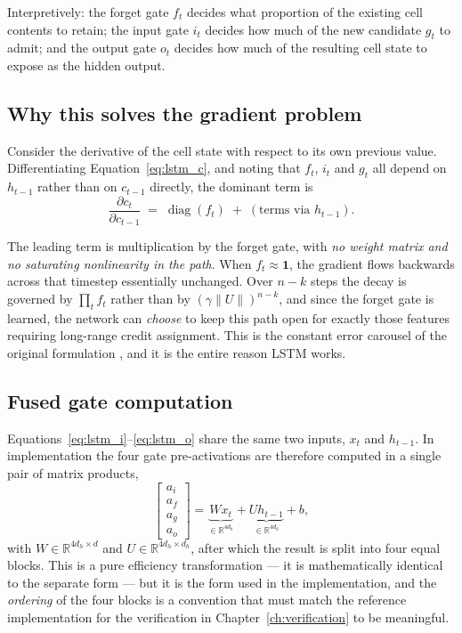 Interpretively: the forget gate $f_t$ decides what proportion of the existing cell contents to
retain; the input gate $i_t$ decides how much of the new candidate $g_t$ to admit; and the output
gate $o_t$ decides how much of the resulting cell state to expose as the hidden output.

\subsection{Why this solves the gradient problem}

Consider the derivative of the cell state with respect to its own previous value. Differentiating
Equation~\ref{eq:lstm_c}, and noting that $f_t$, $i_t$ and $g_t$ all depend on $h_{t-1}$ rather
than on $c_{t-1}$ directly, the dominant term is
\begin{equation}
\frac{\partial c_t}{\partial c_{t-1}} \;=\; \operatorname{diag}(f_t) \;+\; (\text{terms via } h_{t-1}).
\label{eq:lstm_grad}
\end{equation}

The leading term is multiplication by the forget gate, with \emph{no weight matrix and no
saturating nonlinearity in the path}. When $f_t \approx \mathbf{1}$, the gradient flows backwards
across that timestep essentially unchanged. Over $n-k$ steps the decay is governed by
$\prod_t f_t$ rather than by $(\gamma\|U\|)^{n-k}$, and since the forget gate is learned, the
network can \emph{choose} to keep this path open for exactly those features requiring long-range
credit assignment. This is the constant error carousel of the original formulation
\cite{hochreiter1997}, and it is the entire reason LSTM works.

\subsection{Fused gate computation}

Equations~\ref{eq:lstm_i}--\ref{eq:lstm_o} share the same two inputs, $x_t$ and $h_{t-1}$. In
implementation the four gate pre-activations are therefore computed in a single pair of matrix
products,
\begin{equation}
\begin{bmatrix} a_i \\ a_f \\ a_g \\ a_o \end{bmatrix}
  = \underbrace{W x_t}_{\in \mathbb{R}^{4d_h}} + \underbrace{U h_{t-1}}_{\in \mathbb{R}^{4d_h}} + b,
\end{equation}
with $W \in \mathbb{R}^{4d_h \times d}$ and $U \in \mathbb{R}^{4d_h \times d_h}$, after which the
result is split into four equal blocks. This is a pure efficiency transformation --- it is
mathematically identical to the separate form --- but it is the form used in the implementation,
and the \emph{ordering} of the four blocks is a convention that must match the reference
implementation for the verification in Chapter~\ref{ch:verification} to be meaningful.

